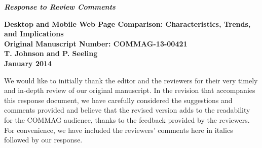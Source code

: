 \documentclass[11pt, draftclsnofoot, onecolumn]{IEEEtran}
\begin{document}
\begin{center}
\begin{large}
\textit{\bf Response to Review Comments}
\end{large}
\end{center}

\begin{center}
\begin{large}
{\bf Desktop and Mobile Web Page Comparison: Characteristics, Trends, and Implications} \\
{\bf Original Manuscript Number: COMMAG-13-00421} \\


{\bf T. Johnson and P. Seeling} \\
{\bf January 2014}  \\

\end{large}
\end{center}

We would like to initially thank the editor and the reviewers for their very timely and in-depth review of our original manuscript.
In the revision that accompanies this response document, we have carefully considered the suggestions and comments provided and believe that the revised version adds to the readability for the COMMAG audience, thanks to the feedback provided by the reviewers.
For convenience, we have included the reviewers' comments here in italics followed by our response. \\
\end{document}

